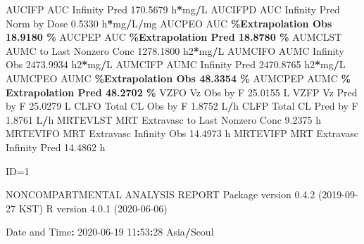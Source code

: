 \documentclass[
  10pt,
]{krantz}
\makeatletter
\newenvironment{Shaded}{\begin{snugshade}}{\end{snugshade}}
\newcommand{\DecValTok}[1]{\textcolor[rgb]{0.00,0.00,0.81}{#1}}
\newcommand{\FloatTok}[1]{\textcolor[rgb]{0.00,0.00,0.81}{#1}}
\newcommand{\NormalTok}[1]{#1}
\newcommand{\OperatorTok}[1]{\textcolor[rgb]{0.81,0.36,0.00}{\textbf{#1}}}
\newcommand{\StringTok}[1]{\textcolor[rgb]{0.31,0.60,0.02}{#1}}
\newenvironment{kframe}{%
\medskip{}
\setlength{\fboxsep}{.8em}
 \def\at@end@of@kframe{}%
 \ifinner\ifhmode%
  \def\at@end@of@kframe{\end{minipage}}%
  \begin{minipage}{\columnwidth}%
 \fi\fi%
 \def\FrameCommand##1{\hskip\@totalleftmargin \hskip-\fboxsep
 \colorbox{shadecolor}{##1}\hskip-\fboxsep
     \hskip-\linewidth \hskip-\@totalleftmargin \hskip\columnwidth}%
 \MakeFramed {\advance\hsize-\width
   \@totalleftmargin\z@ \linewidth\hsize
   \@setminipage}}%
 {\par\unskip\endMakeFramed%
 \at@end@of@kframe}
\renewenvironment{Shaded}{\begin{kframe}}{\end{kframe}}
\makeatother
\begin{document}
\begin{Shaded}
\begin{Highlighting}[]
\NormalTok{AUCIFP     AUC Infinity Pred                             }\FloatTok{170.5679}\NormalTok{ h}\OperatorTok{*}\NormalTok{mg}\OperatorTok{/}\NormalTok{L}
\NormalTok{AUCIFPD    AUC Infinity Pred Norm by Dose                  }\FloatTok{0.5330}\NormalTok{ h}\OperatorTok{*}\NormalTok{mg}\OperatorTok{/}\NormalTok{L}\OperatorTok{/}\NormalTok{mg}
\NormalTok{AUCPEO     AUC }\OperatorTok{\%Extrapolation Obs                         18.9180 \%}
\NormalTok{AUCPEP     AUC }\OperatorTok{\%Extrapolation Pred                        18.8780 \%}
\NormalTok{AUMCLST    AUMC to Last Nonzero Conc                    }\FloatTok{1278.1800}\NormalTok{ h2}\OperatorTok{*}\NormalTok{mg}\OperatorTok{/}\NormalTok{L}
\NormalTok{AUMCIFO    AUMC Infinity Obs                            }\FloatTok{2473.9934}\NormalTok{ h2}\OperatorTok{*}\NormalTok{mg}\OperatorTok{/}\NormalTok{L}
\NormalTok{AUMCIFP    AUMC Infinity Pred                           }\FloatTok{2470.8765}\NormalTok{ h2}\OperatorTok{*}\NormalTok{mg}\OperatorTok{/}\NormalTok{L}
\NormalTok{AUMCPEO    AUMC }\OperatorTok{\%Extrapolation Obs                        48.3354 \%}
\NormalTok{AUMCPEP    AUMC }\OperatorTok{\% Extrapolation Pred                      48.2702 \%}
\NormalTok{VZFO       Vz Obs by F                                    }\FloatTok{25.0155}\NormalTok{ L}
\NormalTok{VZFP       Vz Pred by F                                   }\FloatTok{25.0279}\NormalTok{ L}
\NormalTok{CLFO       Total CL Obs by F                               }\FloatTok{1.8752}\NormalTok{ L}\OperatorTok{/}\NormalTok{h}
\NormalTok{CLFP       Total CL Pred by F                              }\FloatTok{1.8761}\NormalTok{ L}\OperatorTok{/}\NormalTok{h}
\NormalTok{MRTEVLST   MRT Extravasc to Last Nonzero Conc              }\FloatTok{9.2375}\NormalTok{ h}
\NormalTok{MRTEVIFO   MRT Extravasc Infinity Obs                     }\FloatTok{14.4973}\NormalTok{ h}
\NormalTok{MRTEVIFP   MRT Extravasc Infinity Pred                    }\FloatTok{14.4862}\NormalTok{ h}





\NormalTok{ID=}\DecValTok{1}

\NormalTok{                        NONCOMPARTMENTAL ANALYSIS REPORT}
\NormalTok{                       Package version }\DecValTok{0}\NormalTok{.}\FloatTok{4.2}\NormalTok{ (}\DecValTok{2019{-}09{-}27}\NormalTok{ KST)}
\NormalTok{                          R version }\DecValTok{4}\NormalTok{.}\FloatTok{0.1}\NormalTok{ (}\DecValTok{2020{-}06{-}06}\NormalTok{)}

\NormalTok{Date and Time}\OperatorTok{:}\StringTok{ }\DecValTok{2020{-}06{-}19} \DecValTok{11}\OperatorTok{:}\DecValTok{53}\OperatorTok{:}\DecValTok{28}\NormalTok{ Asia}\OperatorTok{/}\NormalTok{Seoul}


\end{Highlighting}
\end{Shaded}
\end{document}
